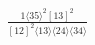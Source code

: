 \documentclass[varwidth, border=5pt]{standalone}
\begin{document}
\begin{my}
$\begin{gathered}
\scriptscriptstyle\frac{1⟨35⟩^2[13]^2}{[12]^2⟨13⟩⟨24⟩⟨34⟩}
\end{gathered}$
\end{my}
\end{document}
